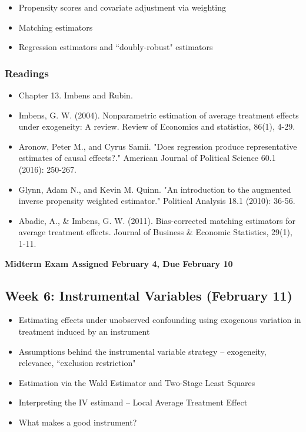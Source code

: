 \documentclass[11pt, article, oneside]{memoir}
\theoremstyle{Assumption}
\begin{document}
\begin{itemize}
\item Propensity scores and covariate adjustment via weighting 
\item Matching estimators
\item Regression estimators and ``doubly-robust" estimators
\end{itemize}


\subsubsection*{Readings}

\begin{itemize}
\item Chapter 13. Imbens and Rubin. 
\item Imbens, G. W. (2004). Nonparametric estimation of average treatment effects under exogeneity: A review. Review of Economics and statistics, 86(1), 4-29.
\item Aronow, Peter M., and Cyrus Samii. "Does regression produce representative estimates of causal effects?." American Journal of Political Science 60.1 (2016): 250-267.
\item Glynn, Adam N., and Kevin M. Quinn. "An introduction to the augmented inverse propensity weighted estimator." Political Analysis 18.1 (2010): 36-56.
\item Abadie, A., \& Imbens, G. W. (2011). Bias-corrected matching estimators for average treatment effects. Journal of Business \& Economic Statistics, 29(1), 1-11.
\end{itemize}


\textbf{Midterm Exam Assigned February 4, Due February 10}

\subsection{Week 6: Instrumental Variables (February 11)}

\begin{itemize}
\item Estimating effects under unobserved confounding using exogenous variation in treatment induced by an instrument
\item Assumptions behind the instrumental variable strategy -- exogeneity, relevance, ``exclusion restriction"
\item Estimation via the Wald Estimator and Two-Stage Least Squares
\item Interpreting the IV estimand -- Local Average Treatment Effect 
\item What makes a good instrument?
\end{itemize}
\end{document}

